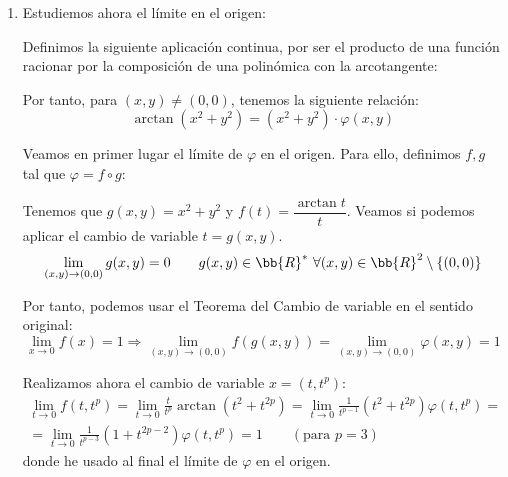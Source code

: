 \begin{ejercicio}
\begin{enumerate}
\begin{enumerate}
            \item Estudiemos ahora el límite en el origen:

            Definimos la siguiente aplicación continua, por ser el producto de una función racionar por la composición de una polinómica con la arcotangente:

            Por tanto, para $(x,y)\neq (0,0)$, tenemos la siguiente relación:
            $$\arctan(x^2+y^2)=(x^2+y^2)\cdot \varphi(x,y)$$

            Veamos en primer lugar el límite de $\varphi$ en el origen. Para ello, definimos $f,g$ tal que $\varphi = f\circ g$:
            \begin{figure}[H]
                \centering
            \end{figure}
            Tenemos que $g(x,y)=x^2+y^2$ y $f(t)=\dfrac{\arctan t}{t}$. Veamos si podemos aplicar el cambio de variable $t=g(x,y)$.
            \begin{equation*}
                \lim_{(x,y)\to (0,0)} g(x,y)=0 \qquad g(x,y)\in \bb{R}^\ast~\forall (x,y)\in \bb{R}^2\setminus \{(0,0)\}
            \end{equation*}

            Por tanto, podemos usar el Teorema del Cambio de variable en el sentido original:
            \begin{equation*}
                \lim_{x\to 0}f(x)=1 \Longrightarrow \lim_{(x,y)\to (0,0)}f(g(x,y))=\lim_{(x,y)\to (0,0)}\varphi(x,y)=1
            \end{equation*}
            
            Realizamos ahora el cambio de variable $x=(t,t^p)$:
            \begin{multline*}
                \lim_{t\to 0}f(t,t^p)
                = \lim_{t\to 0} \frac{t}{t^p}\arctan(t^2+t^{2p})
                = \lim_{t\to 0} \frac{1}{t^{p-1}}(t^2+t^{2p})\varphi (t, t^p)
                =\\= \lim_{t\to 0} \frac{1}{t^{p-3}}(1+t^{2p-2})\varphi (t, t^p) = 1 \qquad (\text{para } p=3)
            \end{multline*}
            donde he usado al final el límite de $\varphi$ en el origen.


\end{enumerate}
\end{enumerate}
\end{ejercicio}
